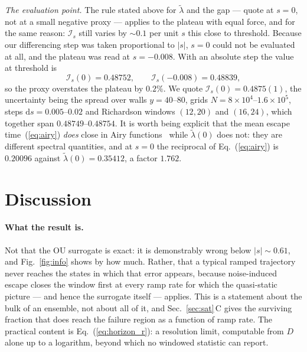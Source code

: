 \documentclass[%
 twocolumn,
 superscriptaddress,
 amsmath,amssymb,
 aps,
 pre,
 floatfix,
]{revtex4-2}
\newcommand{\dd}{\mathrm{d}}
\newcommand{\Ifish}{\mathcal{I}}
\begin{document}
\emph{The evaluation point.}  The rule stated above for $\tilde\lambda$ and the gap --- quote at $s=0$, not at a small negative proxy --- applies to the plateau with equal force, and for the same reason: $\Ifish_s$ still varies by ${\sim}0.1$ per unit $s$ this close to threshold.  Because our differencing step was taken proportional to $|s|$, $s=0$ could not be evaluated at all, and the plateau was read at $s=-0.008$.  With an absolute step the value at threshold is
\begin{equation}
\label{eq:plateauval}
\Ifish_s(0)=0.48752,\qquad \Ifish_s(-0.008)=0.48839 ,
\end{equation}
so the proxy overstates the plateau by $0.2\%$.  We quote $\Ifish_s(0)=0.4875(1)$, the uncertainty being the spread over walls $y=40$--$80$, grids $N=8\times10^4$--$1.6\times10^5$, steps $\dd s=0.005$--$0.02$ and Richardson windows $(12,20)$ and $(16,24)$, which together span $0.48749$--$0.48754$.  It is worth being explicit that the mean escape time~(\ref{eq:airy}) \emph{does} close in Airy functions~\cite{HathcockSethna2021} while $\tilde\lambda(0)$ does not: they are different spectral quantities, and at $s=0$ the reciprocal of Eq.~(\ref{eq:airy}) is $0.20096$ against $\tilde\lambda(0)=0.35412$, a factor $1.762$.

\section{\label{sec:disc}Discussion}

\paragraph{What the result is.}
Not that the OU surrogate is exact: it is demonstrably wrong below $|s|\sim0.61$, and Fig.~\ref{fig:info} shows by how much.  Rather, that a typical ramped trajectory never reaches the states in which that error appears, because noise-induced escape closes the window first at every ramp rate for which the quasi-static picture --- and hence the surrogate itself --- applies.  This is a statement about the bulk of an ensemble, not about all of it, and Sec.~\ref{sec:sat}\,C gives the surviving fraction that does reach the failure region as a function of ramp rate.  The practical content is Eq.~(\ref{eq:horizon_r}): a resolution limit, computable from $D$ alone up to a logarithm, beyond which no windowed statistic can report.
\end{document}
